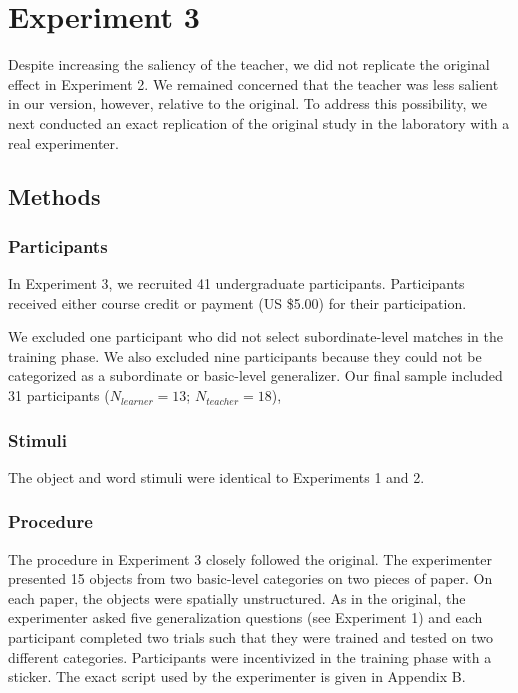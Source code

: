 \documentclass[man]{apa2}
\begin{document}
\section{Experiment 3}

Despite increasing the saliency of the teacher, we did not replicate the original effect in Experiment 2. We remained concerned that the teacher was less salient in our version, however, relative to the original. To address this possibility, we next conducted an exact replication of the original study in the laboratory with a real experimenter.

\subsection{Methods}

\subsubsection{Participants} 

In Experiment 3, we recruited 41 undergraduate participants. Participants received either course credit or payment (US \$5.00) for their participation. 

We excluded one participant who did not select subordinate-level matches in the training phase. We also excluded nine participants because they could not be categorized as a subordinate or basic-level generalizer. Our final sample included 31 participants ($N_{learner} = 13$; $N_{teacher} = 18$),

\subsubsection{Stimuli}

The object and word stimuli were identical to Experiments 1 and 2. 

\subsubsection{Procedure}

The procedure in Experiment 3 closely followed the original. The experimenter presented 15 objects from two basic-level categories on two pieces of paper. On each paper, the objects were spatially unstructured. As in the original, the experimenter asked five generalization questions (see Experiment 1) and each participant completed two trials such that they were trained and tested on two different categories. Participants were incentivized in the training phase with a sticker. The exact script used by the experimenter is given in Appendix B. 
\end{document}
